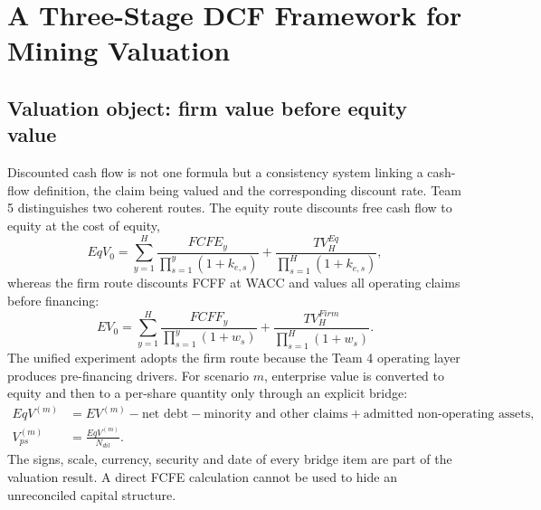 \chapter{A Three-Stage DCF Framework for Mining Valuation}

\section{Valuation object: firm value before equity value}

Discounted cash flow is not one formula but a consistency system linking a
cash-flow definition, the claim being valued and the corresponding discount
rate. Team 5 distinguishes two coherent routes. The equity route discounts
free cash flow to equity at the cost of equity,
\begin{equation}
EqV_0=\sum_{y=1}^{H}\frac{FCFE_y}{\prod_{s=1}^{y}(1+k_{e,s})}
      +\frac{TV_H^{Eq}}{\prod_{s=1}^{H}(1+k_{e,s})},
\end{equation}
whereas the firm route discounts FCFF at WACC and values all operating claims
before financing:
\begin{equation}
EV_0=\sum_{y=1}^{H}\frac{FCFF_y}{\prod_{s=1}^{y}(1+w_s)}
     +\frac{TV_H^{Firm}}{\prod_{s=1}^{H}(1+w_s)}.
\end{equation}
The unified experiment adopts the firm route because the Team 4 operating
layer produces pre-financing drivers. For scenario \(m\), enterprise value is
converted to equity and then to a per-share quantity only through an explicit
bridge:
\begin{align}
EqV^{(m)}
  &=EV^{(m)}-\text{net debt}-\text{minority and other claims}
    +\text{admitted non-operating assets},\\
V_{ps}^{(m)}&=\frac{EqV^{(m)}}{N_{dil}}.
\end{align}
The signs, scale, currency, security and date of every bridge item are part of
the valuation result. A direct FCFE calculation cannot be used to hide an
unreconciled capital structure.


